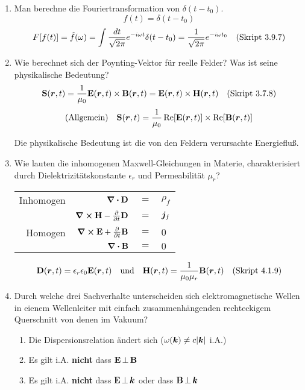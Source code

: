 \begin{enumerate}
  \item Man berechne die Fouriertransformation von $\delta(t-t_0)$. %
        $$f(t)=\delta (t-t_0)$$ 
        $$F[f(t)]=\hat f(\omega)
        =\int\frac{dt}{\sqrt{2\pi}}e^{-i\omega t}\delta(t-t_0)
        =\frac{1}{\sqrt{2\pi}}e^{-i\omega t_0}
        \quad\text{(Skript 3.9.7)}$$ 

  \item Wie berechnet sich der Poynting-Vektor für reelle Felder? Was %
        ist seine physikalische Bedeutung?
        $$\vb S(\vb* r,t)=\frac{1}{\mu_0}\vb E(\vb* r,t)\times\vb B(\vb* r,t)
        =\vb E(\vb* r,t)\times \vb H(\vb* r,t)
        \quad\text{(Skript 3.7.8)}$$
        $$\text{(Allgemein)}\quad\vb S(\vb* r,t)=
        \frac{1}{\mu_0}\Re[\vb E(\vb* r,t)]\times \Re[\vb B(\vb* r,t)]$$
        
        \begin{center}
          Die physikalische Bedeutung ist die von den 
          Feldern verursachte Energiefluß.
        \end{center}

  \clearpage
  \item Wie lauten die inhomogenen Maxwell-Gleichungen in Materie, %
        charakterisiert durch Dielektrizitätskonstante $\epsilon_r$ und
        Permeabilität $\mu_r$?
        \begin{center}
          \begin{tabular}{rrcl}
            Inhomogen&$\div \vb D$ & $=$ &$\rho_f$\\
            &$\curl \vb H-\pdv{t}\vb D$ & $=$ &$\vb* j_f$\\
            Homogen&$\curl \vb E+\pdv{t}\vb B$ & $=$ &$0$\\
            &$\div \vb B$ & $=$ &$0$\\
          \end{tabular}
          $$\vb D(\vb* r,t)=\epsilon_r\epsilon_0\vb E(\vb* r,t) \quad
          \text{und}\quad\vb H(\vb* r, t)=\frac{1}{\mu_0\mu_r}
          \vb B(\vb* r,t)\quad\text{(Skript 4.1.9)}$$
        \end{center}

  \item Durch welche drei Sachverhalte unterscheiden sich %
        elektromagnetische Wellen in eienem Wellenleiter mit einfach
        zusammenhängenden rechteckigem Querschnitt von denen im Vakuum?
        \begin{enumerate}
          \item Die Dispersionsrelation ändert sich 
                ($\omega(\vb* k)\ne c\abs{\vb* k}$ i.A.)
          \item Es gilt i.A. \textbf{nicht} dass $\vb E\,\bot\,\vb B$
          \item Es gilt i.A. \textbf{nicht} dass $\vb E\,\bot\,\vb* k$
                oder dass $\vb B\,\bot\,\vb* k$
        \end{enumerate}
        \begin{center}
        \end{center}


\end{enumerate}
